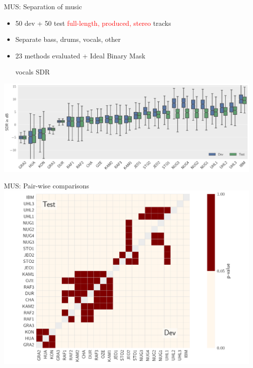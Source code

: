 \documentclass{beamer}
\begin{document}
\begin{frame}{MUS: Separation of music}
\begin{itemize}
\item 50 dev + 50 test \textcolor{red}{full-length, produced, stereo} tracks
\item Separate bass, drums, vocals, other
\item 23 methods evaluated + Ideal Binary Mask
\begin{center}
\vspace{0.5cm}vocals SDR
\end{center}
\end{itemize}
\includegraphics[width=\textwidth]{fig/MUS_SDR.pdf}
\end{frame}

\begin{frame}{MUS: Pair-wise comparisons}
\includegraphics[width=\textwidth]{fig/wilcox_voc_sdr_slide.pdf}
\end{frame}
\end{document}
